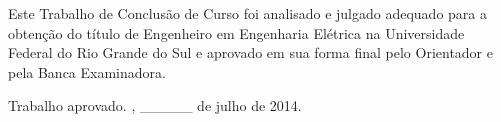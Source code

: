\documentclass[
	12pt,				%
	openright,			%
	twoside,			%
	a4paper,			%
	brazil,
	french,				%
	english
	]{abntex2}
\begin{document}
%
% 
%
\begin{folhadeaprovacao}

  \begin{center}
    {\ABNTEXchapterfont\large\imprimirautor}

    \vspace*{\fill}\vspace*{\fill}
    \begin{center}
      \ABNTEXchapterfont\bfseries\Large\imprimirtitulo
    \end{center}
    \vspace*{\fill}
    
    \hspace{.45\textwidth}
    \begin{minipage}{.5\textwidth}
        Este Trabalho de Conclusão de Curso foi analisado e julgado adequado para a obtenção do título de Engenheiro em Engenharia Elétrica na Universidade Federal do Rio Grande do Sul e aprovado em sua forma final pelo Orientador e pela Banca Examinadora.
    \end{minipage}%
    \vspace*{\fill}
   \end{center}
        
   Trabalho aprovado. \imprimirlocal, \_\_\_\_\_ de julho de 2014.

      
   \begin{center}
    \vspace*{0.5cm}
    {\large\imprimirlocal}
    \par
    {\large\imprimirdata}
    \vspace*{1cm}
  \end{center}
  
\end{folhadeaprovacao}
\end{document}
